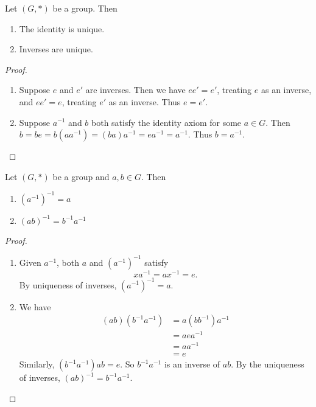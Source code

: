 \documentclass[a4pape]{article}
\begin{document}
\begin{prop}
  Let $(G, *)$ be a group. Then
  \begin{enumerate}
  \item The identity is unique.
  \item Inverses are unique.
  \end{enumerate}
\end{prop}
\begin{proof}\leavevmode
  \begin{enumerate}[label=(\roman{*})]
  \item Suppose $e$ and $e'$ are inverses. Then we have $ee' = e'$, treating $e$ as an inverse, and $ee' = e$, treating $e'$ as an inverse. Thus $e = e'$.
  \item Suppose $a^{-1}$ and $b$ both satisfy the identity axiom for some $a\in G$. Then $b = be = b(aa^{-1}) = (ba)a^{-1} = ea^{-1} = a^{-1}$. Thus $b = a^{-1}$.
  \end{enumerate}
\end{proof}
\begin{prop}
  Let $(G, *)$ be a group and $a, b\in G$. Then
  \begin{enumerate}
  \item $(a^{-1})^{-1} = a$
  \item $(ab)^{-1} = b^{-1}a^{-1}$
  \end{enumerate}
\end{prop}
\begin{proof}\leavevmode
  \begin{enumerate}
  \item Given $a^{-1}$, both $a$ and  $(a^{-1})^{-1}$ satisfy
    \[
    xa^{-1} = ax^{-1} = e.
    \]
    By uniqueness of inverses, $(a^{-1})^{-1} = a$.
  \item We have
    \begin{align*}
      (ab)(b^{-1}a^{-1}) &= a(bb^{-1})a^{-1} \\
      &= aea^{-1}\\
      &= aa^{-1}\\
      &= e
    \end{align*}
    Similarly, $(b^{-1}a^{-1})ab = e$. So $b^{-1}a^{-1}$ is an inverse of $ab$. By the uniqueness of inverses, $(ab)^{-1} = b^{-1}a^{-1}$.
  \end{enumerate}
\end{proof}
\end{document}
